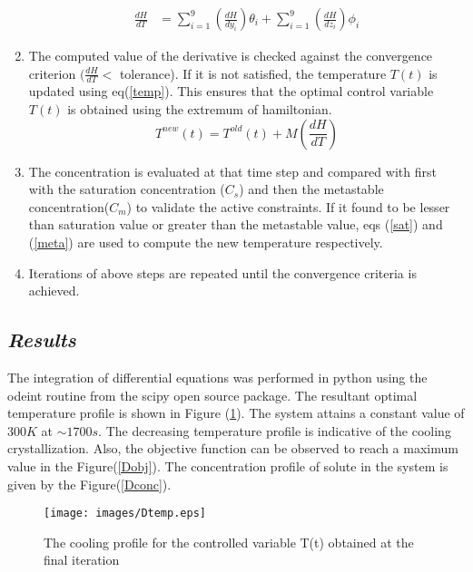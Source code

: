 \documentclass[3p,times,authoryear]{elsarticle}
\begin{document}
\begin{enumerate}
\begin{align}
\frac{dH}{dT} &= \sum_{i=1}^{9} \left( \frac{dH}{dy_{i}}\right) \theta_{i}  + \sum_{i=1}^{9} \left(\frac{dH}{dz_{i}}\right) \phi_{i}  \label{hamiltd} 
\end{align}
\item The computed value of the derivative is checked against the convergence criterion $(\frac{dH}{dT}<$ tolerance). If it is not satisfied, the temperature $T(t)$ is updated using eq(\ref{temp}). This ensures that the optimal control variable $T(t)$ is obtained using the extremum of hamiltonian. 
\begin{equation} 
T^{new}(t) = T^{old}(t) + M\left(\frac{dH}{dT} \right) \label{temp}
\end{equation}
\item The concentration is evaluated  at that time step and compared with first with the saturation concentration ($C_{s}$) and then the metastable concentration($C_{m}$) to validate the active constraints. If it found to be lesser than saturation value or greater than the metastable value, eqs (\ref{sat}) and (\ref{meta}) are used to compute the new temperature respectively. 
\item Iterations of above steps are repeated until the convergence criteria is achieved.
\end{enumerate}

\subsection{\textit{Results}}
The integration of differential equations was performed in python using the odeint routine from the scipy open source package.
The resultant optimal temperature profile is shown in Figure (\ref{Dtemp}). The system attains a constant value of $300 K$ at $\sim1700 s$. The decreasing temperature profile is indicative of the cooling crystallization. Also, the objective function can be observed to reach a maximum value in the Figure(\ref{Dobj}). The concentration profile of solute in the system is given by the Figure(\ref{Dconc}). 

\begin{figure}[H] 
\begin{center}
\texttt{[image: images/Dtemp.eps]}
\end{center}
\caption{The cooling profile for the controlled variable T(t) obtained at the final iteration} \label{Dtemp}
\end{figure}
\end{document}
